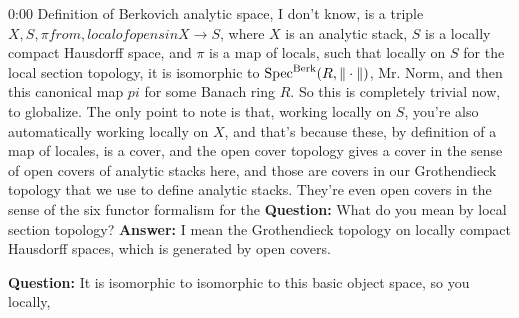 \begin{unfinished}{0:00}
Definition of Berkovich analytic space, I don't know, is a triple $X, S, \pi from, local of opens in X \to S$, where $X$ is an analytic stack, $S$ is a locally compact Hausdorff space, and $\pi$ is a map of locals, such that locally on $S$ for the local section topology, it is isomorphic to $\operatorname{Spec}^{\mathrm{Berk}} (R, \| \cdot \|)$, Mr. Norm, and then this canonical map $pi$ for some Banach ring $R$. 
So this is completely trivial now, to globalize. The only point to note is that, working locally on $S$, you're also automatically working locally on $X$, and that's because these, by definition of a map of locales, is a cover, and the open cover topology gives a cover in the sense of open covers of analytic stacks here, and those are covers in our Grothendieck topology that we use to define analytic stacks.
They're even open covers in the sense of the six functor formalism for the 
\textbf{Question:} What do you mean by local section topology?
\textbf{Answer:} I mean the Grothendieck topology on locally compact Hausdorff spaces, which is generated by open covers.

\textbf{Question:} It is isomorphic to isomorphic to this basic object space, so you locally, 


\end{unfinished}

